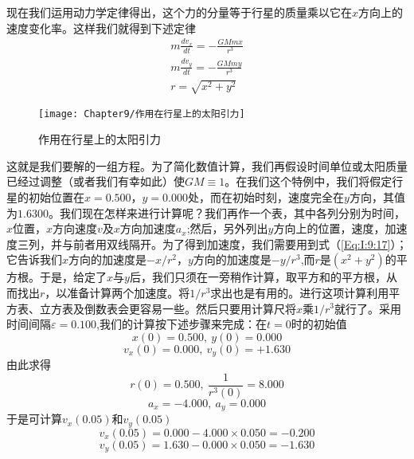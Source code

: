 现在我们运用动力学定律得出，这个力的分量等于行星的质量乘以它在$x$方向上的速度变化率。这样我们就得到下述定律
\begin{equation}
    \label{Eq:I:9:17}
    \begin{split}
        m\frac{dv_x}{dt}=-\frac{GMmx}{r^3} \\
        m\frac{dv_y}{dt}=-\frac{GMmy}{r^3} \\
        r=\sqrt{x^2+y^2}
    \end{split}
\end{equation}
\begin{wrapfigure}{r}{0.35\textwidth}
    \centering
    \texttt{[image: Chapter9/作用在行星上的太阳引力]}
    \caption{作用在行星上的太阳引力}
    \label{figure:作用在行星上的太阳引力}
\end{wrapfigure}
这就是我们要解的一组方程。为了简化数值计算，我们再假设时间单位或太阳质量已经过调整（或者我们有幸如此）使$GM\equiv 1$。在我们这个特例中，我们将假定行星的初始位置在$x=0.500$，$y=0.000$处，而在初始时刻，速度完全在$y$方向，其值为$1.6300$。我们现在怎样来进行计算呢？我们再作一个表，其中各列分别为时间，$x$位置，$x$方向速度$v$及$x$方向加速度$a_x$;然后，另外列出$y$方向上的位置，速度，加速度三列，并与前者用双线隔开。为了得到加速度，我们需要用到式（\ref{Eq:I:9:17}）；它告诉我们$x$方向的加速度是$-x/r^2$，$y$方向的加速度是$-y/r^3$,而$r$是$(x^2+y^2)$的平方根。于是，给定了$x$与$y$后，我们只须在一旁稍作计算，取平方和的平方根，从而找出$r$，以准备计算两个加速度。将$1/r^3$求出也是有用的。进行这项计算利用平方表、立方表及倒数表会更容易一些。然后只要用计算尺将$x$乘$1/r^3$就行了。采用时间间隔$\varepsilon =0.100$,我们的计算按下述步骤来完成：在$t=0$时的初始值
\begin{equation*}
    x(0)=0.500,~y(0)=0.000
\end{equation*}
\begin{equation*}
    v_x(0)=0.000,~v_y(0)=+1.630
\end{equation*}
由此求得
\begin{equation*}
    r(0)=0.500,~\frac{1}{r^3(0)}=8.000
\end{equation*}
\begin{equation*}
    a_x=-4.000,~a_y=0.000
\end{equation*}
于是可计算$v_x(0.05)$和$v_y(0.05)$
\begin{equation*}
    v_x(0.05)=0.000-4.000 \times 0.050 = -0.200
\end{equation*}
\begin{equation*}
    v_y(0.05)=1.630-0.000 \times 0.050 = -1.630
\end{equation*}
